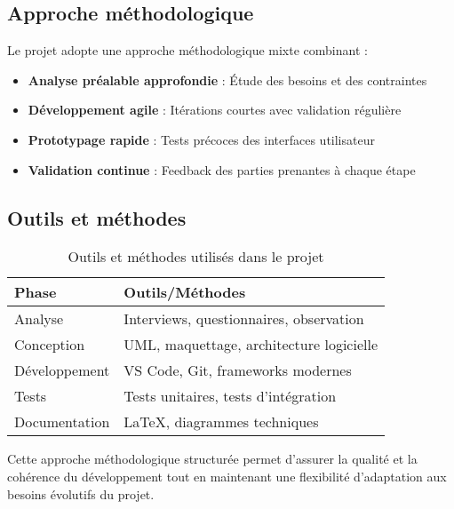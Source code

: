 \subsection{Approche méthodologique}

Le projet adopte une approche méthodologique mixte combinant :

\begin{itemize}
\item \textbf{Analyse préalable approfondie} : Étude des besoins et des contraintes
\item \textbf{Développement agile} : Itérations courtes avec validation régulière
\item \textbf{Prototypage rapide} : Tests précoces des interfaces utilisateur
\item \textbf{Validation continue} : Feedback des parties prenantes à chaque étape
\end{itemize}

\subsection{Outils et méthodes}

\begin{table}[H]
\centering
\caption{Outils et méthodes utilisés dans le projet}
\begin{tabular}{|l|l|}
\hline
\textbf{Phase} & \textbf{Outils/Méthodes} \\
\hline
Analyse & Interviews, questionnaires, observation \\
Conception & UML, maquettage, architecture logicielle \\
Développement & VS Code, Git, frameworks modernes \\
Tests & Tests unitaires, tests d'intégration \\
Documentation & LaTeX, diagrammes techniques \\
\hline
\end{tabular}
\end{table}

Cette approche méthodologique structurée permet d'assurer la qualité et la cohérence du développement tout en maintenant une flexibilité d'adaptation aux besoins évolutifs du projet.
